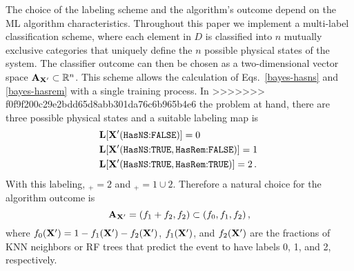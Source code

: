 The choice of the labeling scheme and the algorithm's outcome depend on the \ac{ML} algorithm characteristics. Throughout this paper we implement a multi-label classification scheme, where each
element in $D$ is classified into $n$ mutually exclusive categories that uniquely define the $n$ possible physical states of the system. The classifier outcome can then be chosen as a
two-dimensional vector space ${\bf A}_{{\bf X}'}\subset \mathbb{R}^n$. This scheme allows the calculation of Eqs.~\eqref{bayes-hasns} and \eqref{bayes-hasrem} with a single training process. In
>>>>>>> f0f9f200c29e2bdd65d8abb301da76c6b965b4e6
the problem at hand, there are three possible physical states and a suitable labeling
map is 
%
\begin{align}
&{\bf L}[{\bf X}'(\hbox{{{\tt HasNS}}:{{\tt FALSE}}})]=0\,\nonumber\\
&{\bf L}[{\bf X}'(\hbox{{{\tt HasNS}}:{{\tt TRUE}}},\hbox{{{\tt HasRem}}:{{\tt FALSE}}})]=1\,\\
&{\bf L}[{\bf X}'(\hbox{{{\tt HasNS}}:{{\tt TRUE}}},\hbox{{{\tt HasRem}}:{{\tt TRUE}}})]=2\,.\nonumber
\end{align}
%
With this labeling, \hasrem$_+=2$ and \hasns$_+=1\cup 2$. Therefore a natural choice for the algorithm outcome is
%
\begin{equation}
{\bf A}_{\bf X'}=(f_1+f_2,f_2)\subset (f_0,f_1,f_2)\,,
\end{equation}
%
where $f_0({\bf X}')=1-f_1({\bf X}')-f_2({\bf X}')$, $f_1({\bf X}')$, and $f_2({\bf X}')$ are the fractions of \ac{KNN} neighbors or \ac{RF} trees that predict the event to
have labels 0, 1, and 2, respectively.

%
%

